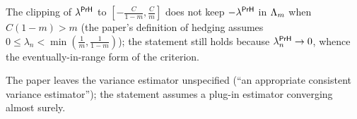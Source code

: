 \begin{remark}
  The clipping of $\lambda^{\mathsf{PrH}}$ to $[-\frac{C}{1-m}, \frac Cm]$ does not keep $-\lambda^{\mathsf{PrH}}$ in $\Lambda_m$ when
  $C(1-m) > m$ (the paper's definition of hedging assumes $0 \le \lambda_n < \min(\frac1m,
  \frac{1}{1-m})$); the statement still holds because $\lambda^{\mathsf{PrH}}_n \to 0$, whence the eventually-in-range
  form of the criterion.
\end{remark}

\begin{remark}
  The paper leaves the variance estimator unspecified (``an appropriate consistent variance
  estimator''); the statement assumes a plug-in estimator converging almost surely.
\end{remark}
